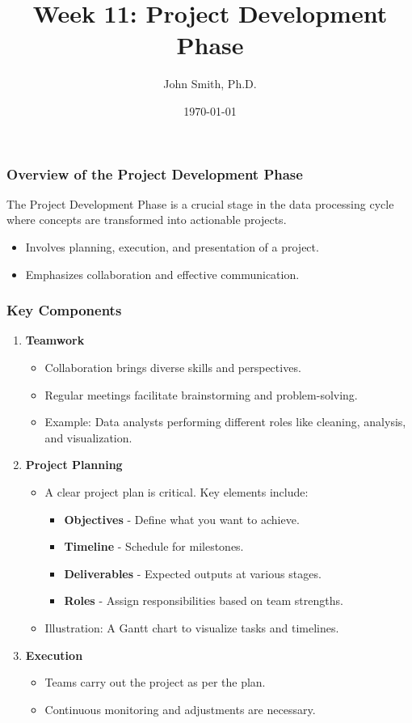 \documentclass[aspectratio=169]{beamer}
\title[Week 11: Project Development Phase]{Week 11: Project Development Phase}
\author[J. Smith]{John Smith, Ph.D.}
\institute[University Name]{
  Department of Computer Science\\
  University Name\\
  \vspace{0.3cm}
  Email: email@university.edu\\
  Website: www.university.edu
}
\date{\today}
\begin{document}
\frame{\titlepage}

\begin{frame}[fragile]
    \titlepage
\end{frame}

\begin{frame}[fragile]
    \frametitle{Overview of the Project Development Phase}
    The Project Development Phase is a crucial stage in the data processing cycle where concepts are transformed into actionable projects. 
    \begin{itemize}
        \item Involves planning, execution, and presentation of a project.
        \item Emphasizes collaboration and effective communication.
    \end{itemize}
\end{frame}

\begin{frame}[fragile]
    \frametitle{Key Components}
    \begin{enumerate}
        \item \textbf{Teamwork}
        \begin{itemize}
            \item Collaboration brings diverse skills and perspectives.
            \item Regular meetings facilitate brainstorming and problem-solving.
            \item Example: Data analysts performing different roles like cleaning, analysis, and visualization.
        \end{itemize}
        
        \item \textbf{Project Planning}
        \begin{itemize}
            \item A clear project plan is critical. Key elements include:
            \begin{itemize}
                \item \textbf{Objectives} - Define what you want to achieve.
                \item \textbf{Timeline} - Schedule for milestones.
                \item \textbf{Deliverables} - Expected outputs at various stages.
                \item \textbf{Roles} - Assign responsibilities based on team strengths.
            \end{itemize}
            \item Illustration: A Gantt chart to visualize tasks and timelines.
        \end{itemize}
        
        \item \textbf{Execution}
        \begin{itemize}
            \item Teams carry out the project as per the plan.
            \item Continuous monitoring and adjustments are necessary.
        \end{itemize}
    \end{enumerate}
\end{frame}
\end{document}
